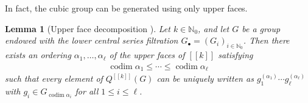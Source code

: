\documentclass[11pt]{amsart}
\newtheorem{lemma}{Lemma}[section]
\theoremstyle{definition}
\newcommand{\N}{{\mathbb N}}
\newcommand{\cube}[1]{{[\![#1]\!]}}
\newcommand{\1}{{\mathbf{1}}}
\DeclareMathOperator{\codim}{codim}
\begin{document}
In fact, the cubic group can be generated using only upper faces. 
\begin{lemma}[Upper face decomposition {\cite[Chapter 6, Proposition~17]{HK18}}]\label{L: upper face}
    Let $k\in\N_0$, and let $G$ be a group endowed with the lower central series filtration $G_\bullet = (G_i)_{i\in\N_0}$. Then there exists an ordering $\alpha_1, \ldots,\alpha_\ell$ of the upper faces of $\cube{k}$ satisfying
    \begin{align*}
        {\codim \alpha_1 \leq \cdots \leq \codim \alpha_\ell}
    \end{align*}
    such that every element of $Q^{\cube{k}}(G)$ can be uniquely written as $g_1^{(\alpha_1)}\cdots g_\ell^{(\alpha_\ell)}$
    with $g_i\in G_{\codim \alpha_i}$ for all $1\leq i\leq \ell$.
\end{lemma}
\end{document}
